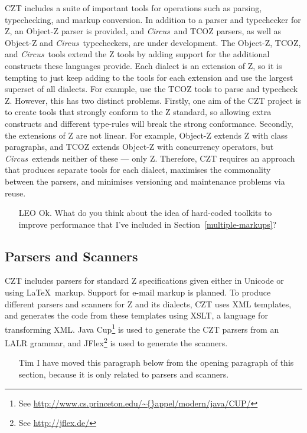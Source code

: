 \documentclass{llncs}
\newcommand{\Circus}{{\sf\slshape Circus}}
\begin{document}
  CZT includes a suite of important tools for operations such as
  parsing, typechecking, and markup conversion. In addition to a
  parser and typechecker for Z, an Object-Z parser is provided, and
  \Circus\ and TCOZ parsers, as well as Object-Z and \Circus\
  typecheckers, are under development.  The Object-Z, TCOZ, and
  \Circus\ tools extend the Z tools by adding support for the
  additional constructs these languages provide.  Each dialect is an
  extension of Z, so it is tempting to just keep adding to the tools
  for each extension and use the largest superset of all dialects. For
  example, use the TCOZ tools to parse and typecheck Z. However, this
  has two distinct problems. Firstly, one aim of the CZT project is to
  create tools that strongly conform to the Z standard, so allowing
  extra constructs and different type-rules will break the strong
  conformance. Secondly, the extensions of Z are not linear. For
  example, Object-Z extends Z with class paragraphs, and TCOZ extends
  Object-Z with concurrency operators, but \Circus\ extends neither of
  these --- only Z. Therefore, CZT requires an approach that produces
  separate tools for each dialect, maximises the commonality between
  the parsers, and minimises versioning and maintenance problems via
  reuse.


  \begin{itemize}
    \item[LEO] Ok. What do you think about the idea of hard-coded toolkits to
               improve performance that I've included in Section~\ref{multiple-markups}?
  \end{itemize}

\subsection{Parsers and Scanners}

  CZT includes parsers for standard Z specifications given either in
  Unicode or using \LaTeX\ markup.  Support for e-mail markup is
  planned. To produce different parsers and scanners for Z and its
  dialects, CZT uses XML templates, and generates the code from these
  templates using XSLT, a language for transforming XML. Java
  Cup\footnote{See
  \url{http://www.cs.princeton.edu/\~{}appel/modern/java/CUP/}} is
  used to generate the CZT parsers from an LALR grammar, and
  JFlex\footnote{See \url{http://jflex.de/}} is used to generate the
  scanners. 

  \begin{itemize}
    \item[Tim] I have moved this paragraph below from the opening
    paragraph of this section, because it is only related to parsers
    and scanners.
  \end{itemize}
\end{document}
